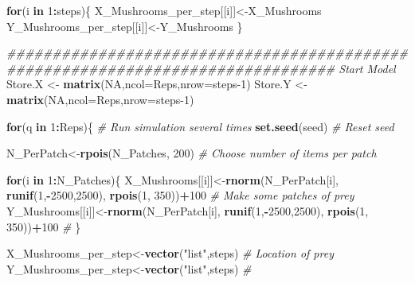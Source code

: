 \documentclass[
]{article}
\newenvironment{Shaded}{\begin{snugshade}}{\end{snugshade}}
\newcommand{\CommentTok}[1]{\textcolor[rgb]{0.56,0.35,0.01}{\textit{#1}}}
\newcommand{\ControlFlowTok}[1]{\textcolor[rgb]{0.13,0.29,0.53}{\textbf{#1}}}
\newcommand{\DataTypeTok}[1]{\textcolor[rgb]{0.13,0.29,0.53}{#1}}
\newcommand{\DecValTok}[1]{\textcolor[rgb]{0.00,0.00,0.81}{#1}}
\newcommand{\KeywordTok}[1]{\textcolor[rgb]{0.13,0.29,0.53}{\textbf{#1}}}
\newcommand{\NormalTok}[1]{#1}
\newcommand{\OperatorTok}[1]{\textcolor[rgb]{0.81,0.36,0.00}{\textbf{#1}}}
\newcommand{\OtherTok}[1]{\textcolor[rgb]{0.56,0.35,0.01}{#1}}
\newcommand{\StringTok}[1]{\textcolor[rgb]{0.31,0.60,0.02}{#1}}
\begin{document}
\begin{Shaded}
\begin{Highlighting}[]
\ControlFlowTok{for}\NormalTok{(i }\ControlFlowTok{in} \DecValTok{1}\OperatorTok{:}\NormalTok{steps)\{}
\NormalTok{ X_Mushrooms_per_step[[i]]<-X_Mushrooms}
\NormalTok{ Y_Mushrooms_per_step[[i]]<-Y_Mushrooms}
\NormalTok{\}                                                                 }
                                                                                     
\CommentTok{################################################################################ Start Model}
\NormalTok{Store.X <-}\StringTok{ }\KeywordTok{matrix}\NormalTok{(}\OtherTok{NA}\NormalTok{,}\DataTypeTok{ncol=}\NormalTok{Reps,}\DataTypeTok{nrow=}\NormalTok{steps}\DecValTok{-1}\NormalTok{)}
\NormalTok{Store.Y <-}\StringTok{ }\KeywordTok{matrix}\NormalTok{(}\OtherTok{NA}\NormalTok{,}\DataTypeTok{ncol=}\NormalTok{Reps,}\DataTypeTok{nrow=}\NormalTok{steps}\DecValTok{-1}\NormalTok{)}

\ControlFlowTok{for}\NormalTok{(q }\ControlFlowTok{in} \DecValTok{1}\OperatorTok{:}\NormalTok{Reps)\{                                                               }\CommentTok{# Run simulation several times}
\KeywordTok{set.seed}\NormalTok{(seed)                                                                  }\CommentTok{# Reset seed}

\NormalTok{N_PerPatch<-}\KeywordTok{rpois}\NormalTok{(N_Patches, }\DecValTok{200}\NormalTok{)                                               }\CommentTok{# Choose number of items per patch}

\ControlFlowTok{for}\NormalTok{(i }\ControlFlowTok{in} \DecValTok{1}\OperatorTok{:}\NormalTok{N_Patches)\{}
\NormalTok{X_Mushrooms[[i]]<-}\KeywordTok{rnorm}\NormalTok{(N_PerPatch[i], }\KeywordTok{runif}\NormalTok{(}\DecValTok{1}\NormalTok{,}\OperatorTok{-}\DecValTok{2500}\NormalTok{,}\DecValTok{2500}\NormalTok{), }\KeywordTok{rpois}\NormalTok{(}\DecValTok{1}\NormalTok{, }\DecValTok{350}\NormalTok{))}\OperatorTok{+}\DecValTok{100}  \CommentTok{# Make some patches of prey}
\NormalTok{Y_Mushrooms[[i]]<-}\KeywordTok{rnorm}\NormalTok{(N_PerPatch[i], }\KeywordTok{runif}\NormalTok{(}\DecValTok{1}\NormalTok{,}\OperatorTok{-}\DecValTok{2500}\NormalTok{,}\DecValTok{2500}\NormalTok{), }\KeywordTok{rpois}\NormalTok{(}\DecValTok{1}\NormalTok{, }\DecValTok{350}\NormalTok{))}\OperatorTok{+}\DecValTok{100}  \CommentTok{#}
\NormalTok{\}}

\NormalTok{X_Mushrooms_per_step<-}\KeywordTok{vector}\NormalTok{(}\StringTok{"list"}\NormalTok{,steps)                                      }\CommentTok{# Location of prey}
\NormalTok{Y_Mushrooms_per_step<-}\KeywordTok{vector}\NormalTok{(}\StringTok{"list"}\NormalTok{,steps)                                      }\CommentTok{#}


\end{Highlighting}
\end{Shaded}
\end{document}
